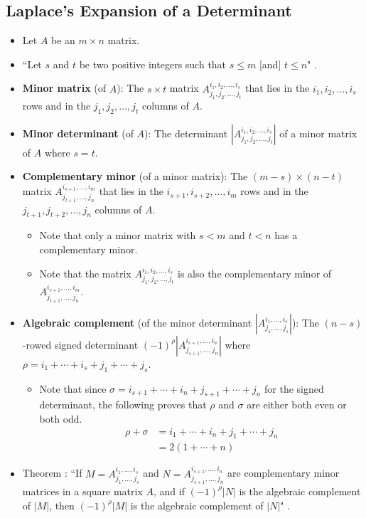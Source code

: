 \documentclass[titlepage]{article}
\newcounter{theorem}
\newcommand{\newtrm}[1]{\refstepcounter{theorem}\label{#1}Theorem \thetheorem: }
\numberwithin{figure}{section}
\numberwithin{equation}{section}
\numberwithin{theorem}{section}
\newcommand{\dq}[4][]{``#2"#1 \cite[#4]{#3}.}
\begin{document}
\subsection{Laplace's Expansion of a Determinant}
\begin{itemize}
    \item Let $A$ be an $m\times n$ matrix.
    \item \dq{Let $s$ and $t$ be two positive integers such that $s\leq m$ [and] $t\leq n$}{bib:determinants}{21}
    \item \textbf{Minor matrix} (of $A$): The $s\times t$ matrix $A_{j_1,j_2,\dots,j_t}^{i_1,i_2,\dots,i_s}$ that lies in the $i_1,i_2,\dots,i_s$ rows and in the $j_1,j_2,\dots,j_t$ columns of $A$.
    \item \textbf{Minor determinant} (of $A$): The determinant $\left|A_{j_1,j_2,\dots,j_t}^{i_1,i_2,\dots,i_s}\right|$ of a minor matrix of $A$ where $s=t$.
    \item \textbf{Complementary minor} (of a minor matrix): The $(m-s)\times(n-t)$ matrix $A_{j_{t+1},\dots,j_n}^{i_{s+1},\dots,i_m}$ that lies in the $i_{s+1},i_{s+2},\dots,i_m$ rows and in the $j_{t+1},j_{t+2},\dots,j_n$ columns of $A$.
    \begin{itemize}
        \item Note that only a minor matrix with $s<m$ and $t<n$ has a complementary minor.
        \item Note that the matrix $A_{j_1,j_2,\dots,j_t}^{i_1,i_2,\dots,i_s}$ is also the complementary minor of $A_{j_{t+1},\dots,j_n}^{i_{s+1},\dots,i_m}$.
    \end{itemize}
    \item \textbf{Algebraic complement} (of the minor determinant $\left|A_{j_1,\dots,j_s}^{i_1,\dots,i_s}\right|$): The $(n-s)$-rowed signed determinant $(-1)^\rho \left|A_{j_{s+1},\dots,j_n}^{i_{s+1},\dots,i_n}\right|$ where $\rho = i_1+\cdots+i_s+j_1+\cdots+j_s$.
    \begin{itemize}
        \item Note that since $\sigma = i_{s+1}+\cdots+i_n+j_{s+1}+\cdots+j_n$ for the signed determinant, the following proves that $\rho$ and $\sigma$ are either both even or both odd.
        \begin{align*}
            \rho+\sigma &= i_1+\cdots+i_n+j_1+\cdots+j_n\\
            &= 2(1+\cdots+n)
        \end{align*}
    \end{itemize}
    \item \newtrm{trm:algcompment}\dq{If $M=A_{j_1,\dots,j_s}^{i_1,\dots,i_s}$ and $N=A_{j_{s+1},\dots,j_n}^{i_{s+1},\dots,i_n}$ are complementary minor matrices in a square matrix $A$, and if $(-1)^\rho|N|$ is the algebraic complement of $|M|$, then $(-1)^\rho|M|$ is the algebraic complement of $|N|$}{bib:determinants}{21}

\end{itemize}
\end{document}
